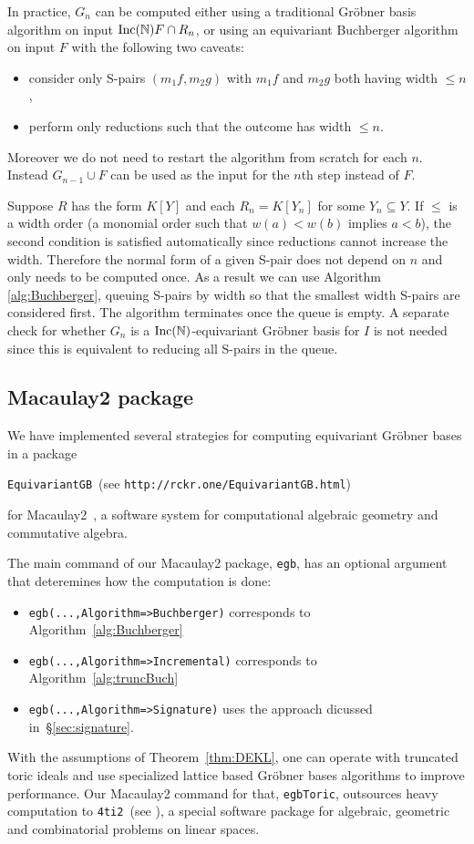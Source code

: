 In practice, $G_n$ can be computed either using a traditional Gr\"obner basis algorithm on input $\operatorname{Inc}(\mathbb N) F \cap R_n$, or using an equivariant Buchberger algorithm on input $F$ with the following two caveats:
\begin{itemize}
 \item consider only S-pairs $(m_1f, m_2g)$ with $m_1f$ and $m_2g$ both having width $\leq n$,
 \item perform only reductions such that the outcome has width $\leq n$.
\end{itemize}
Moreover we do not need to restart the algorithm from scratch for each $n$.  Instead $G_{n-1} \cup F$ can be used as the input for the $n$th step instead of $F$.

Suppose $R$ has the form $K[Y]$ and each $R_n = K[Y_n]$ for some $Y_n \subseteq Y$.  If $\leq$ is a width order (a monomial order such that $w(a) < w(b)$ implies $a < b$), the second condition is satisfied automatically since reductions cannot increase the width.  Therefore the normal form of a given S-pair does not depend on $n$ and only needs to be computed once.  As a result we can use Algorithm \ref{alg:Buchberger}, queuing S-pairs by width so that the smallest width S-pairs are considered first.  The algorithm terminates once the queue is empty.  A separate check for whether $G_n$ is a $\operatorname{Inc}(\mathbb N)$-equivariant Gr\"obner basis for $I$ is not needed since this is equivalent to reducing all S-pairs in the queue.

\subsection{Macaulay2 package}

We have implemented several strategies for computing equivariant Gr\"obner bases in a package \begin{center}
\verb|EquivariantGB|~(see {\tt http://rckr.one/EquivariantGB.html}) 
\end{center}
for Macaulay2~\cite{grayson2002macaulay}, a software system for computational algebraic geometry and commutative algebra.

The main command of our Macaulay2 package, \verb|egb|, has an optional argument that deteremines how the computation is done:
\begin{itemize}
\item 
\verb|egb(...,Algorithm=>Buchberger)| corresponds to Algorithm~\ref{alg:Buchberger}
\item 
\verb|egb(...,Algorithm=>Incremental)| corresponds to Algorithm~\ref{alg:truncBuch}
\item 
\verb|egb(...,Algorithm=>Signature)| uses the approach dicussed in~\S\ref{sec:signature}.
\end{itemize}

\begin{remark}\label{rem:4ti2}
With the assumptions of Theorem~\ref{thm:DEKL}, one can operate  with truncated toric ideals and use specialized lattice based Gr\"obner bases algorithms to improve performance. 
Our Macaulay2 command for that, \verb|egbToric|, outsources heavy computation to \verb|4ti2|~(see \cite{4ti2}),  a special software package for algebraic, geometric and combinatorial problems on linear spaces.   
\end{remark}
